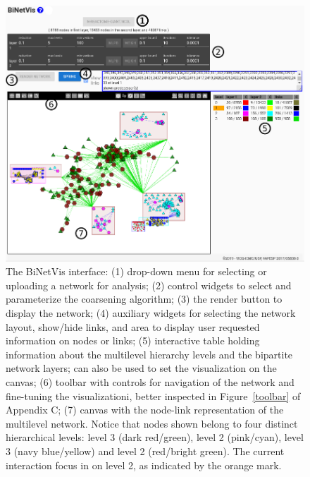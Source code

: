 \documentclass[runningheads]{llncs}
\begin{document}
\begin{figure}\centering
 \includegraphics[width=\textwidth]{overall2_}
  \caption{The BiNetVis interface: (1) drop-down menu for selecting or uploading a network for analysis;
  (2) control widgets to select and parameterize the coarsening algorithm;  (3) the render button to display the network; (4) auxiliary widgets for selecting the network layout, show/hide links, and area to display user requested information on nodes or links; (5) interactive table holding information about the multilevel hierarchy levels and the bipartite network layers; can also be used to set the visualization on the canvas; (6) toolbar with controls for navigation of the network and fine-tuning the visualizationi, better inspected in Figure~\ref{toolbar} of Appendix C; (7) canvas with the node-link representation of the multilevel network. Notice that nodes shown belong to four distinct hierarchical levels: level 3 (dark red/green), level 2 (pink/cyan), level 3 (navy blue/yellow) and level 2 (red/bright green). The current interaction focus in on level 2, as indicated by the orange mark. 
  }\label{fpage0}
\end{figure}
\end{document}
